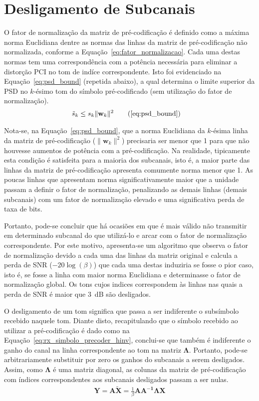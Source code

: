 \section{Desligamento de Subcanais}
\label{sec:desligamento_subcanais}

O fator de normalização da matriz de pré-codificação é definido como a máxima norma Euclidiana dentre as normas das linhas da matriz de pré-codificação não normalizada, conforme a Equação~\ref{eq:fator_normalizacao}. Cada uma destas normas tem uma correspondência com a potência necessária para eliminar a distorção PCI no tom de indíce correspondente. Isto foi evidenciado na Equação~\ref{eq:psd_bound} (repetida abaixo), a qual determina o limite superior da PSD no $k$-ésimo tom do símbolo pré-codificado (sem utilização do fator de normalização). 
\begin{align}
\tilde{s}_k  &\leq s_k \| \mathbf{w}_k \|^2 
\tag{\ref{eq:psd_bound}}
\end{align}

Nota-se, na Equação~\ref{eq:psd_bound}, que a norma Euclidiana da $k$-ésima linha da matriz de pré-codificação ($\| \mathbf{w}_k \|^2$) precisaria ser menor que 1 para que não houvesse aumentos de potência com a pré-codificação. Na realidade, tipicamente esta condição é satisfeita para a maioria dos subcanais, isto é, a maior parte das linhas da matriz de pré-codificação apresenta comumente norma menor que 1. As poucas linhas que apresentam norma significativamente maior que a unidade passam a definir o fator de normalização, penalizando as demais linhas (demais subcanais) com um fator de normalização elevado e uma significativa perda de taxa de bits.

Portanto, pode-se concluir que há ocasiões em que é mais válido não transmitir em determinado subcanal do que utilizá-lo e arcar com o fator de normalização correspondente. Por este motivo, apresenta-se um algoritmo que observa o fator de normalização devido a cada uma das linhas da matriz original e calcula a perda de SNR ($-20 \log \left( \beta \right)$) que cada uma destas   induziria se fosse o pior caso, isto é, se fosse a linha com maior norma Euclidiana e determinasse o fator de normalização global. Os tons cujos indices correspondem às linhas nas quais a perda de SNR é maior que $3$~dB são desligados.

O desligamento de um tom significa que passa a ser indiferente o subsímbolo recebido naquele tom. Diante disto, recapitulando que o símbolo recebido ao utilizar a pré-codificação é dado como na Equação~\ref{eq:rx_simbolo_precoder_hinv}, conclui-se que também é indiferente o ganho do canal na linha correspondente ao tom na matriz $\mathbf{\Lambda}$. Portanto, pode-se arbitrariamente substituir por zero os ganhos do subcanais a serem desligados. Assim, como  $\mathbf{\Lambda}$ é uma matriz diagonal, as colunas da matriz de pré-codificação com índices correspondentes aos subcanais desligados passam a ser nulas.
\begin{align}
\mathbf{Y} = \mathbf{A \tilde{X}} = \frac{1}{\beta}\mathbf{A A^{-1} \Lambda} \mathbf{X}
\label{eq:rx_simbolo_precoder_hinv}
\end{align}

